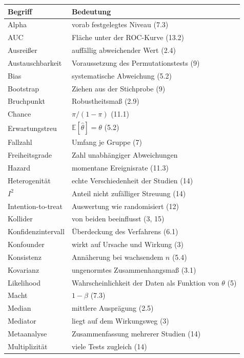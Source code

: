 \begin{merksatz}
\begin{center}
{\small
\renewcommand{\arraystretch}{1.3}
\begin{longtable}{@{}P{3.2cm}P{5.4cm}@{}}
\toprule
\textbf{Begriff} & \textbf{Bedeutung}\\
\midrule
\endhead
Alpha & vorab festgelegtes Niveau (7.3)\\
AUC & Fläche unter der ROC-Kurve (13.2)\\
Ausreißer & auffällig abweichender Wert (2.4)\\
Austauschbarkeit & Voraussetzung des Permutationstests (9)\\
Bias & systematische Abweichung (5.2)\\
Bootstrap & Ziehen aus der Stichprobe (9)\\
Bruchpunkt & Robustheitsmaß (2.9)\\
Chance & $\pi/(1-\pi)$ (11.1)\\
Erwartungstreu & $\mathbb{E}[\hat\theta] = \theta$ (5.2)\\
Fallzahl & Umfang je Gruppe (7)\\
Freiheitsgrade & Zahl unabhängiger Abweichungen\\
Hazard & momentane Ereignisrate (11.3)\\
Heterogenität & echte Verschiedenheit der Studien (14)\\
$I^2$ & Anteil nicht zufälliger Streuung (14)\\
Intention-to-treat & Auswertung wie randomisiert (12)\\
Kollider & von beiden beeinflusst (3, 15)\\
Konfidenzintervall & Überdeckung des Verfahrens (6.1)\\
Konfounder & wirkt auf Ursache und Wirkung (3)\\
Konsistenz & Annäherung bei wachsendem $n$ (5.4)\\
Kovarianz & ungenormtes Zusammenhangsmaß (3.1)\\
Likelihood & Wahrscheinlichkeit der Daten als Funktion von $\theta$ (5)\\
Macht & $1-\beta$ (7.3)\\
Median & mittlere Ausprägung (2.5)\\
Mediator & liegt auf dem Wirkungsweg (3)\\
Metaanalyse & Zusammenfassung mehrerer Studien (14)\\
Multiplizität & viele Tests zugleich (14)\\

\end{longtable}}
\end{center}
\end{merksatz}
